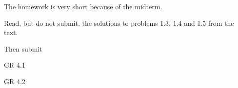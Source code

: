\documentclass[minion]{homework}
\begin{document}
The homework is very short because of the midterm.

Read, but do not submit, the solutions to problems 1.3, 1.4 and 1.5 from the text.

Then submit

\begin{aproblems}

\hproblem GR 4.1

\hproblem GR 4.2

\end{aproblems}
\end{document}
